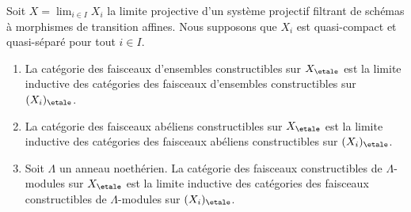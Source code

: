 \begin{lemma}
\label{lemma-category-is-colimit}
Soit $X = \lim_{i \in I} X_i$ la limite projective d'un système
projectif filtrant de schémas à morphismes de transition affines.
Nous supposons que $X_i$ est quasi-compact et quasi-séparé
pour tout $i \in I$.
\begin{enumerate}
\item La catégorie des faisceaux d'ensembles constructibles sur $X_\etale$
est la limite inductive des catégories des faisceaux d'ensembles constructibles
sur $(X_i)_\etale$.
\item La catégorie des faisceaux abéliens constructibles sur $X_\etale$
est la limite inductive des catégories des faisceaux abéliens constructibles
sur $(X_i)_\etale$.
\item Soit $\Lambda$ un anneau noethérien. La catégorie des faisceaux constructibles
de $\Lambda$-modules sur $X_\etale$ est la limite inductive des
catégories des faisceaux constructibles de $\Lambda$-modules sur $(X_i)_\etale$.
\end{enumerate}
\end{lemma}

